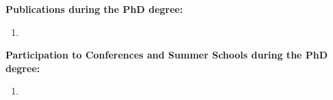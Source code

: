 \textbf{Publications during the PhD degree:}
\begin{enumerate}
    \item 
\end{enumerate}

\vspace{1em}

\textbf{Participation to Conferences and Summer Schools during the PhD degree:}
\begin{enumerate}
    \item
\end{enumerate}
